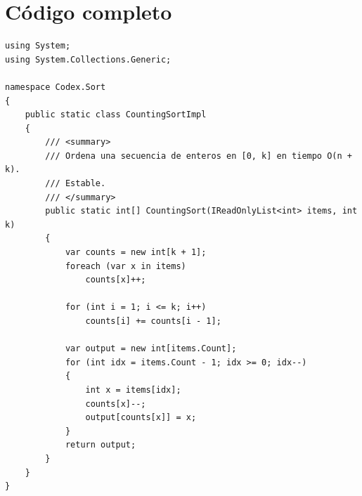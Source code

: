 \documentclass[11pt,a4paper]{article}
\begin{document}
\section{Código completo}

\begin{lstlisting}[caption={\texttt{CountingSort.cs} --- ordenamiento por conteo}]
using System;
using System.Collections.Generic;

namespace Codex.Sort
{
    public static class CountingSortImpl
    {
        /// <summary>
        /// Ordena una secuencia de enteros en [0, k] en tiempo O(n + k).
        /// Estable.
        /// </summary>
        public static int[] CountingSort(IReadOnlyList<int> items, int k)
        {
            var counts = new int[k + 1];
            foreach (var x in items)
                counts[x]++;

            for (int i = 1; i <= k; i++)
                counts[i] += counts[i - 1];

            var output = new int[items.Count];
            for (int idx = items.Count - 1; idx >= 0; idx--)
            {
                int x = items[idx];
                counts[x]--;
                output[counts[x]] = x;
            }
            return output;
        }
    }
}
\end{lstlisting}
\end{document}
